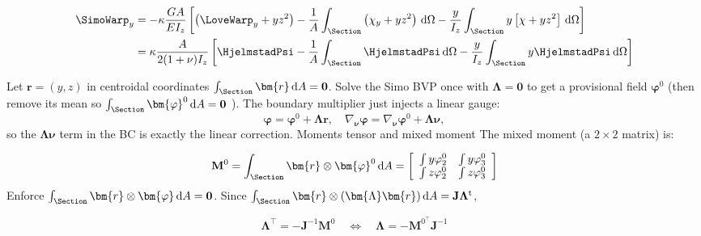 \begin{equation}
\begin{aligned}
\SimoWarp_y
&=-\kappa\frac{G A}{E I_z}\left[\bigl(\LoveWarp_y + y z^2\bigr)-\frac{1}{A} \int_{\Section}\left(\chi_y+y z^2\right)\, \mathrm{d} \Omega-\frac{y}{I_z} \int_{\Section} y\left[\chi+y z^2\right]\, \mathrm{d} \Omega\right] \\
&= \kappa\frac{A}{2(1+\nu) I_z}\left[\HjelmstadPsi -\frac{1}{A} \int_{\Section} \HjelmstadPsi\, \mathrm{d} \Omega
-\frac{y}{I_z} \int_{\Section} y \HjelmstadPsi \, \mathrm{d} \Omega\right] \\
\end{aligned}
\end{equation}



\begin{Quote}

Let $\bm{r}=(y, z)$ in centroidal coordinates $\int_{\Section} \bm{r} \,\mathrm{d} A=\mathbf{0}$.
Solve the Simo BVP once with $\bm{\Lambda}=\mathbf{0}$ to get a provisional field $\bm{\varphi}^0$ (then remove its mean so $\int_{\Section} \bm{\varphi}^0 \,\mathrm{d} A=\mathbf{0}$ ). 
The boundary multiplier just injects a linear gauge:
$$
\bm{\varphi}=\bm{\varphi}^0+\bm{\Lambda}\bm{r}, 
\quad 
\nabla_{\bm{\nu}} \bm{\varphi}=\nabla_{\bm{\nu}} \bm{\varphi}^0+\bm{\Lambda} \bm{\nu},
$$
so the $\bm{\Lambda}\bm{\nu}$ term in the BC is exactly the linear correction.
Moments tensor and mixed moment
%
The mixed moment (a $2 \times 2$ matrix) is:

$$
\mathbf{M}^0=\int_{\Section} \bm{r} \otimes \bm{\varphi}^0 \,\mathrm{d} A=\left[\begin{array}{lll}
\int y \varphi_2^0 & \int y \varphi_3^0 \\
\int z \varphi_2^0 & \int z \varphi_3^0
\end{array}\right]
$$
Enforce $\int_{\Section} \bm{r} \otimes \bm{\varphi} \,\mathrm{d} A=\mathbf{0}$.
Since $\int_{\Section} \bm{r} \otimes(\bm{\Lambda}\bm{r}) \,\mathrm{d} A=\mathbf{J} \mathbf{\Lambda}^{\rm t}$,

$$
\mathbf{\Lambda}^{\top}=-\mathbf{J}^{-1} \mathbf{M}^0 
\quad \Longleftrightarrow \quad 
\bm{\Lambda}=-\mathbf{M}^{0^{\top}} \mathbf{J}^{-1}
$$
\end{Quote}

